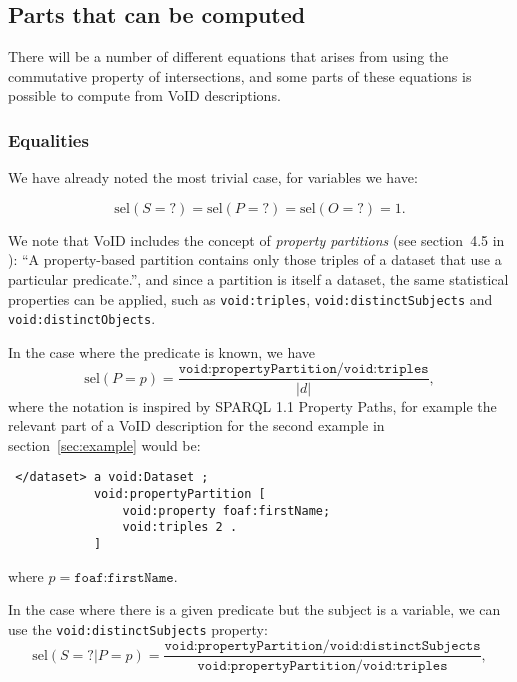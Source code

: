 \documentclass[12pt, draft]{article}
\newcommand{\rdfterm}[1]{\texttt{#1}}
\newcommand{\sel}[1]{\ensuremath{\mathrm{sel}\left(#1\right)}}
\begin{document}
\subsection{Parts that can be computed}

There will be a number of different equations that arises from using
the commutative property of intersections, and some parts of these
equations is possible to compute from VoID descriptions.

\subsubsection{Equalities}

We have already noted the most trivial case, for variables we have:

\begin{equation}\label{eq:selvar}
\sel{S = ?} = \sel{P = ?} = \sel{O = ?} = 1 .
\end{equation}

We note that VoID includes the concept of \emph{property partitions}
(see section~4.5 in \cite{voidnote}): ``A property-based partition
contains only those triples of a dataset that use a particular
predicate.'', and since a partition is itself a dataset, the same
statistical properties can be applied, such as \rdfterm{void:triples},
\rdfterm{void:distinctSubjects} and \rdfterm{void:distinctObjects}.

In the case where the predicate is known, we have
\begin{equation}\label{eq:selPp}
 \sel{P = p} =
   \frac{\rdfterm{void:propertyPartition/void:triples}}{|d|} ,
\end{equation}
where the notation is inspired by SPARQL 1.1 Property Paths, for
example the relevant part of a VoID description for the second example
in section~\ref{sec:example} would be:
\begin{verbatim}
 </dataset> a void:Dataset ;
            void:propertyPartition [
                void:property foaf:firstName;
                void:triples 2 .
            ]
\end{verbatim}
where $p = \rdfterm{foaf:firstName}$.


In the case where there is a given predicate but the subject is a
variable, we can use the \rdfterm{void:distinctSubjects} property:
\begin{equation}\label{eq:selSvPp}
 \sel{S = ? | P = p} =
   \frac{\rdfterm{void:propertyPartition/void:distinctSubjects}}{\rdfterm{void:propertyPartition/void:triples}} ,
\end{equation}
\end{document}
